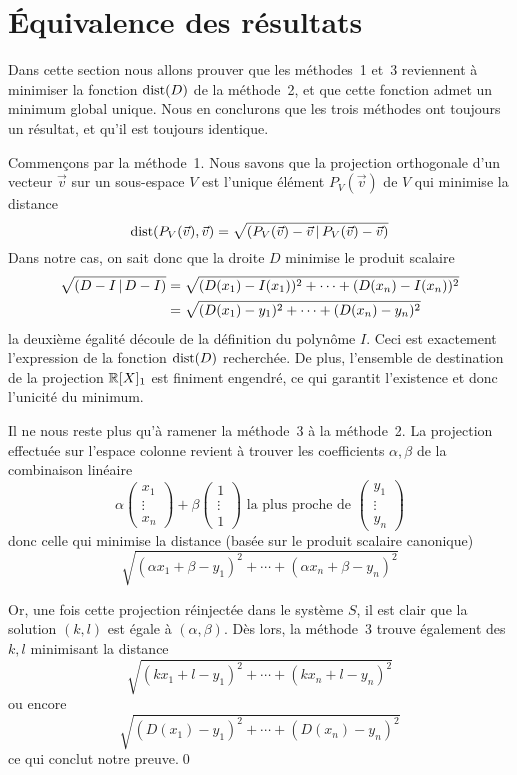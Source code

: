 \section{Équivalence des résultats}
\label{sec:approx-lin/resultat}

Dans cette section nous allons prouver que les méthodes~1 et~3
reviennent à minimiser la fonction $\mathrm{dist}(D)$ de la méthode~2,
et que cette fonction admet un minimum global unique.
Nous en conclurons que les trois méthodes ont toujours un résultat,
et qu'il est toujours identique.

Commençons par la méthode~1.
Nous savons que la projection orthogonale d'un vecteur $\vec{v}$
sur un sous-espace $V$ est l'unique élément $P_V(\vec{v})$
de $V$ qui minimise la distance
\begin{equation}
    \mathrm{dist}(P_V(\vec{v}),\vec{v}) =
    \sqrt{\left(P_V(\vec{v})-\vec{v}\,\middle|\,P_V(\vec{v})-\vec{v}\right)}
\end{equation}
Dans notre cas, on sait donc que la droite $D$ minimise
le produit scalaire
\begin{equation}
    \begin{aligned}
        \sqrt{\left(D-I\,\middle|\,D-I\right)}
        &= \sqrt{(D(x_1)-I(x_1))^2+\cdots+(D(x_n)-I(x_n))^2} \\
        &= \sqrt{(D(x_1)-y_1)^2+\cdots+(D(x_n)-y_n)^2}
    \end{aligned}
\end{equation}
la deuxième égalité découle de la définition du polynôme $I$.
Ceci est exactement l'expression de la fonction $\mathrm{dist}(D)$ recherchée.
De plus, l'ensemble de destination de la projection $\mathbb{R}[X]_1$
est finiment engendré, ce qui garantit l'existence et donc l'unicité
du minimum.

Il ne nous reste plus qu'à ramener la méthode~3 à la méthode~2.
La projection effectuée sur l'espace colonne revient à trouver
les coefficients $\alpha,\beta$ de la combinaison linéaire
\[
    \alpha
    \left(
        \begin{array}{c}
            x_1\\\vdots\\x_n
        \end{array}
    \right)
    +\beta
    \left(
        \begin{array}{c}
            1\\\vdots\\1
        \end{array}
    \right)
    \mbox{ la plus proche de }
    \left(
        \begin{array}{c}
            y_1\\\vdots\\y_n
        \end{array}
    \right)
\]
donc celle qui minimise la distance (basée sur le produit scalaire canonique)
\[
    \sqrt{(\alpha x_1 + \beta - y_1)^2+\cdots+(\alpha x_n + \beta - y_n)^2}
\]

Or, une fois cette projection réinjectée dans le système $S$,
il est clair que la solution $(k,l)$ est égale à $(\alpha,\beta)$.
Dès lors, la méthode~3 trouve également des $k,l$ minimisant
la distance
\[
    \sqrt{(kx_1+l-y_1)^2+\cdots+(kx_n+l-y_n)^2}
\]
ou encore
\[
    \sqrt{(D(x_1)-y_1)^2+\cdots+(D(x_n)-y_n)^2}
\]
ce qui conclut notre preuve.\qed
